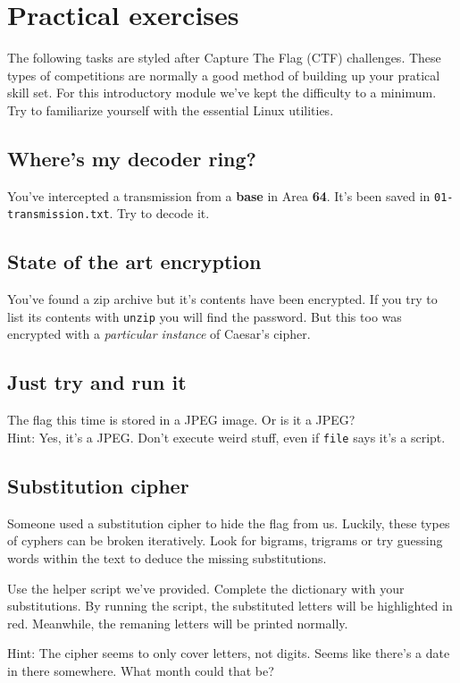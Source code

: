 \newpage

\section{Practical exercises}

The following tasks are styled after Capture The Flag (CTF) challenges. These
types of competitions are normally a good method of building up your pratical
skill set. For this introductory module we've kept the difficulty to a minimum.
Try to familiarize yourself with the essential Linux utilities.

\subsection{Where's my decoder ring?}

You've intercepted a transmission from a \textbf{base} in Area \textbf{64}.
It's been saved in \texttt{01-transmission.txt}. Try to decode it.

\subsection{State of the art encryption}

You've found a zip archive but it's contents have been encrypted. If you
try to list its contents with \texttt{unzip} you will find the password. But
this too was encrypted with a \textit{particular instance} of Caesar's cipher.

\subsection{Just try and run it}

The flag this time is stored in a JPEG image. Or is it a JPEG? \\
Hint: Yes, it's a JPEG. Don't execute weird stuff, even if \texttt{file} says
      it's a script.

\subsection{Substitution cipher}

Someone used a substitution cipher to hide the flag from us. Luckily, these
types of cyphers can be broken iteratively. Look for bigrams, trigrams or try
guessing words within the text to deduce the missing substitutions.

Use the helper script we've provided. Complete the dictionary with your
substitutions. By running the script, the substituted letters will be
highlighted in red. Meanwhile, the remaning letters will be printed normally.

Hint: The cipher seems to only cover letters, not digits. Seems like there's a
      date in there somewhere. What month could that be?

